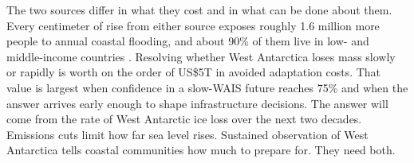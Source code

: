 \documentclass[11pt]{article}
\begin{document}
The two sources differ in what they cost and in what can be done about them. Every centimeter of rise from either source exposes roughly 1.6 million more people to annual coastal flooding, and about 90\% of them live in low- and middle-income countries \citep{Kulp2019, Jongman2012}. Resolving whether West Antarctica loses mass slowly or rapidly is worth on the order of US\$5T in avoided adaptation costs. That value is largest when confidence in a slow-WAIS future reaches 75\% and when the answer arrives early enough to shape infrastructure decisions. The answer will come from the rate of West Antarctic ice loss over the next two decades. Emissions cuts limit how far sea level rises. Sustained observation of West Antarctica tells coastal communities how much to prepare for. They need both.



\end{document}
